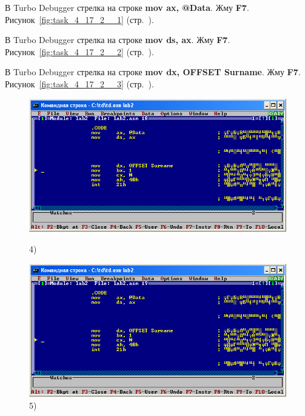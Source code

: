 В Turbo Debugger стрелка на строке \textbf{mov ax, @Data}.
Жму \textbf{F7}.
Рисунок~\ref{fig:task_4_17_2__1} (стр.~\pageref{fig:task_4_17_2__1}).

В Turbo Debugger стрелка на строке \textbf{mov ds, ax}.
Жму \textbf{F7}.
Рисунок~\ref{fig:task_4_17_2__2} (стр.~\pageref{fig:task_4_17_2__2}).

В Turbo Debugger стрелка на строке \textbf{mov dx, OFFSET Surname}.
Жму \textbf{F7}.
Рисунок~\ref{fig:task_4_17_2__3} (стр.~\pageref{fig:task_4_17_2__3}).

\begin{figure}[!htp]
    \centering
    \begin{minipage}{0.32\textwidth}
        \centering
        \includegraphics[width=.99\linewidth]
            {../_INCLUDES/task-4-17-2/4.png}
        \caption{4) }
        \label{fig:task_4_17_2__4}
    \end{minipage}
    \begin {minipage}{0.32\textwidth}
        \centering
        \includegraphics[width=.99\linewidth]
            {../_INCLUDES/task-4-17-2/5.png}
        \caption{5) }
        \label{fig:task_4_17_2__5}
    \end{minipage}
    \begin {minipage}{0.32\textwidth}

\end{minipage}
\end{figure}
